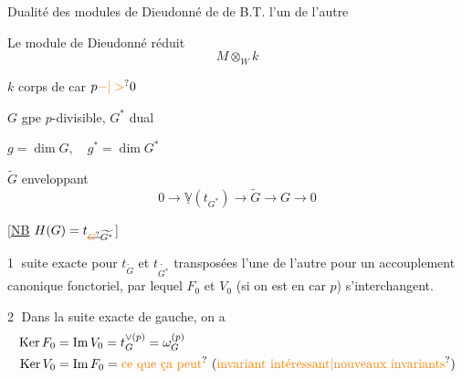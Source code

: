 Dualité des modules de Dieudonné de  de B.T.  l'un de l'autre 

Le module de Dieudonné réduit
\[
M\otimes_{W} k
\]

$k$ corps de car $p\unsure{\mathord{-}|>}0$

$G$ gpe $p$-divisible, $G^{*}$ dual

$g=\dim G,\quad g^{*}=\dim G^{*}$

$\widetilde G$  enveloppant
\[
0\longrightarrow\underline{\mathbb V}(t_{G^{*}})\longrightarrow\widetilde G\longrightarrow G\longrightarrow0
\]


[\uline{NB} $H(G)=t_{\deleted{\unsure{G}}\widetilde{G^{*}}}$]

\textcircled{1} suite exacte pour $t_{\widetilde G}$ et $t_{\widetilde{G^{*}}}$ transposées l'une de l'autre pour un accouplement canonique fonctoriel,  par lequel $F_0$ et $V_0$ (si on est en car $p$) s'interchangent.

\textcircled{2} Dans la suite exacte de gauche, on a
\[
\begin{aligned}
\operatorname{Ker} F_0&=\operatorname{Im} V_0=t_G^{\vee(p)}=\omega_G^{(p)}\\
\operatorname{Ker} V_0&=\operatorname{Im} F_0=\text{\unsure{ce que ça peut} (\unsure{invariant intéressant|nouveaux invariants})}
\end{aligned}
\]

